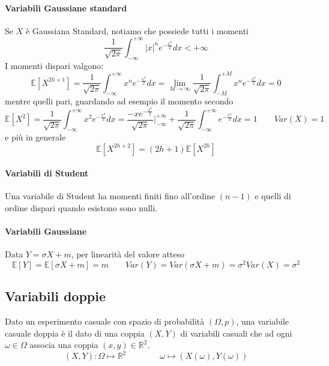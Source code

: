 \paragraph{Variabili Gaussiane standard}
Se $X$ è Gaussiana Standard, notiamo che possiede tutti i momenti
\begin{equation}
	\frac{1}{\sqrt{2\pi}}\int_{-\infty}^{+\infty}\lvert x\rvert^ne^{-\frac{x^2}{2}} dx < +\infty
\end{equation}
I momenti dispari valgono:
\begin{equation}
	\mathbb{E}[X^{2h+1}] = \frac{1}{\sqrt{2\pi}}\int_{-\infty}^{+\infty}x^ne^{-\frac{x^2}{2}}dx = \lim_{M \to \infty}\frac{1}{\sqrt{2\pi}}\int_{-M}^{+M}x^ne^{-\frac{x^2}{2}}dx=0
\end{equation}
mentre quelli pari, guardando ad esempio il momento secondo
\begin{equation}
	\mathbb{E}[X^2]=\frac{1}{\sqrt{2\pi}}\int_{-\infty}^{+\infty}x^2e^{-\frac{x^2}{2}}dx = \frac{-xe^{-\frac{x^2}{2}}}{\sqrt{2\pi}}\bigg\vert^{+\infty}_{-\infty}+\frac{1}{\sqrt{2\pi}}\int_{-\infty}^{+\infty}e^{-\frac{x^2}{2}}dx = 1 \quad\quad Var(X)=1
\end{equation}
e più in generale
\begin{equation}
	\mathbb{E}[X^{2h+2}]=(2h+1)\mathbb{E}[X^{2h}]
\end{equation}

\paragraph{Variabili di Student}
Una variabile di Student ha momenti finiti fino all'ordine $(n-1)$ e quelli di ordine dispari quando esistono sono nulli.

\paragraph{Variabili Gaussiane}
Data $Y=\sigma X + m$, per linearità del valore atteso
\begin{equation}
	\mathbb{E}[Y] = \mathbb{E}[\sigma X + m] = m \quad\quad Var(Y)=Var(\sigma X +m)=\sigma^2Var(X) = \sigma^2
\end{equation}

\subsection{Variabili doppie}
Dato un esperimento casuale con spazio di probabilità $(\Omega, p)$, una variabile casuale doppia è il dato di una coppia $(X,Y)$ di variabili casuali che ad ogni $\omega \in \Omega$ associa una coppia $(x,y) \in \mathbb{R}^2$.
\begin{equation}
	(X,Y): \Omega \mapsto \mathbb{R}^2 \qquad \qquad \omega \mapsto(X(\omega),Y(\omega))
\end{equation}

